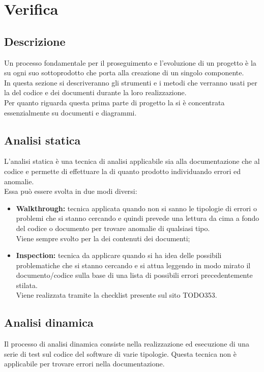 \documentclass[NormeDiProgetto.tex]{subfiles}
\begin{document}
	\section{Verifica}
	
	\subsection{Descrizione}
	Un processo fondamentale per il proseguimento e l'evoluzione di un progetto è la  su ogni suo sottoprodotto che porta alla creazione di un singolo componente.\\
	In questa sezione si descriveranno gli strumenti e i metodi che verranno usati per la  del codice e dei documenti durante la loro realizzazione.\\
	Per quanto riguarda questa prima parte di progetto la  si è concentrata essenzialmente su documenti e diagrammi.
	
	\subsection{Analisi statica}
	L'analisi statica è una tecnica di analisi applicabile sia alla documentazione che al codice e permette di effettuare la  di quanto prodotto individuando errori ed anomalie.\\
	Essa può essere svolta in due modi diversi:
		\begin{itemize}
			\item \textbf{Walkthrough:} tecnica applicata quando non si sanno le tipologie di errori o problemi che si stanno cercando e quindi prevede una lettura da cima a fondo del codice o documento per trovare anomalie di qualsiasi tipo.\\
			Viene sempre svolto per la  dei contenuti dei documenti;
						
			\item \textbf{Inspection:} tecnica da applicare quando si ha idea delle possibili problematiche che si stanno cercando e si attua leggendo in modo mirato il documento/codice sulla base di una lista di possibili errori precedentemente stilata.\\
			Viene realizzata tramite la checklist presente sul sito TODO353.
		\end{itemize}
	
	\subsection{Analisi dinamica}
	Il processo di analisi dinamica consiste nella realizzazione ed esecuzione di una serie di test sul codice del software di varie tipologie. Questa tecnica non è applicabile per trovare errori nella documentazione.
	
\end{document}
